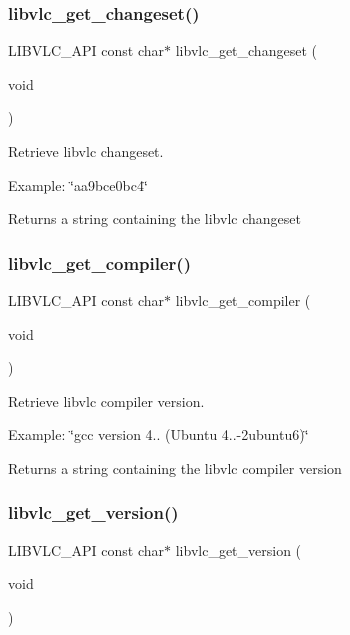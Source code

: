 \subsubsection{\texorpdfstring{libvlc\+\_\+get\+\_\+changeset()}{libvlc\_get\_changeset()}}
{\footnotesize\ttfamily L\+I\+B\+V\+L\+C\+\_\+\+A\+PI const char$\ast$ libvlc\+\_\+get\+\_\+changeset (\begin{DoxyParamCaption}\item[{void}]{ }\end{DoxyParamCaption})}

Retrieve libvlc changeset.

Example\+: \char`\"{}aa9bce0bc4\char`\"{}

\begin{DoxyReturn}{Returns}
a string containing the libvlc changeset 
\end{DoxyReturn}
\mbox{\label{group__libvlc__core_ga7cac13c14411e4764f119a368af78c1b}} 
\subsubsection{\texorpdfstring{libvlc\+\_\+get\+\_\+compiler()}{libvlc\_get\_compiler()}}
{\footnotesize\ttfamily L\+I\+B\+V\+L\+C\+\_\+\+A\+PI const char$\ast$ libvlc\+\_\+get\+\_\+compiler (\begin{DoxyParamCaption}\item[{void}]{ }\end{DoxyParamCaption})}

Retrieve libvlc compiler version.

Example\+: \char`\"{}gcc version 4.. (\+Ubuntu 4..-\/2ubuntu6)\char`\"{}

\begin{DoxyReturn}{Returns}
a string containing the libvlc compiler version 
\end{DoxyReturn}
\mbox{\label{group__libvlc__core_ga950b9828d1391f06fe56ce5d03483b9f}} 
\subsubsection{\texorpdfstring{libvlc\+\_\+get\+\_\+version()}{libvlc\_get\_version()}}
{\footnotesize\ttfamily L\+I\+B\+V\+L\+C\+\_\+\+A\+PI const char$\ast$ libvlc\+\_\+get\+\_\+version (\begin{DoxyParamCaption}\item[{void}]{ }\end{DoxyParamCaption})}

